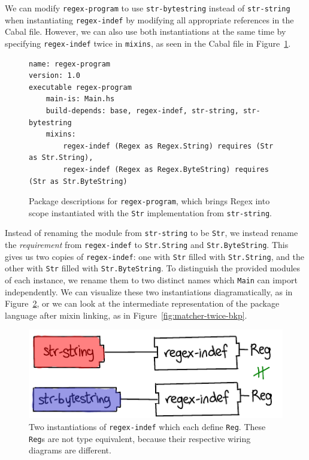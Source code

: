 We can modify \verb|regex-program| to use \verb|str-bytestring| instead
of \verb|str-string| when instantiating \verb|regex-indef| by modifying
all appropriate references in the Cabal file.  However, we can also use
both instantiations at the same time by specifying \verb|regex-indef|
twice in \verb|mixins|, as seen in the Cabal file in
Figure~\ref{fig:regex-program-multi}.

\begin{figure}
\begin{lstlisting}[language=Cabal]
name: regex-program
version: 1.0
executable regex-program
    main-is: Main.hs
    build-depends: base, regex-indef, str-string, str-bytestring
    mixins:
        regex-indef (Regex as Regex.String) requires (Str as Str.String),
        regex-indef (Regex as Regex.ByteString) requires (Str as Str.ByteString)
\end{lstlisting}
\caption{Package descriptions for \texttt{regex-program}, which brings
Regex into scope instantiated with the \texttt{Str} implementation from \texttt{str-string}.}
\label{fig:regex-program-multi}
\end{figure}

Instead of renaming the module from \verb|str-string| to be \verb|Str|,
we instead rename the \emph{requirement} from \verb|regex-indef| to
\verb|Str.String| and \verb|Str.ByteString|.  This gives us two copies
of \verb|regex-indef|: one with \verb|Str| filled with
\verb|Str.String|, and the other with \verb|Str| filled with
\verb|Str.ByteString|.  To distinguish the provided modules of each
instance, we rename them to two distinct names which \verb|Main|
can import independently.  We can visualize these two instantiations
diagramatically, as in Figure~\ref{fig:regex-indef-twice}, or
we can look at the intermediate representation of the package language
after mixin linking, as in Figure~\ref{fig:matcher-twice-bkp}.

\begin{figure}
\center\includegraphics{figures/regex-indef-twice.pdf}
\caption{Two instantiations of \texttt{regex-indef} which each define
\texttt{Reg}.  These \texttt{Reg}s are not type equivalent, because
their respective wiring diagrams are different.}
\label{fig:regex-indef-twice}
\end{figure}

